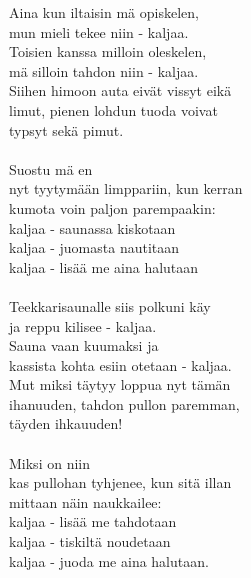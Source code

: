 
            Aina kun iltaisin mä opiskelen, \\
            mun mieli tekee niin - kaljaa. \\
            Toisien kanssa milloin oleskelen, \\
            mä silloin tahdon niin - kaljaa. \\
            Siihen himoon auta eivät vissyt eikä \\
            limut, pienen lohdun tuoda voivat \\
            typsyt sekä pimut. \\
\hspace{10mm} \\
            Suostu mä en \\
            nyt tyytymään limppariin, kun kerran \\
            kumota voin paljon parempaakin: \\
            kaljaa - saunassa kiskotaan \\
            kaljaa - juomasta nautitaan \\
            kaljaa - lisää me aina halutaan \\
\hspace{10mm} \\
            Teekkarisaunalle siis polkuni käy \\
            ja reppu kilisee - kaljaa. \\
            Sauna vaan kuumaksi ja \\
            kassista kohta esiin otetaan - kaljaa. \\
            Mut miksi täytyy loppua nyt tämän \\
            ihanuuden, tahdon pullon paremman, \\
            täyden ihkauuden! \\
\hspace{10mm} \\
            Miksi on niin \\
            kas pullohan tyhjenee, kun sitä illan \\
            mittaan näin naukkailee: \\
            kaljaa - lisää me tahdotaan \\
            kaljaa - tiskiltä noudetaan \\
            kaljaa - juoda me aina halutaan. \\
